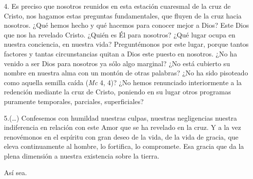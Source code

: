 \begin{body}
4. Es preciso que nosotros reunidos en esta estación cuaresmal de la cruz de Cristo, nos hagamos estas preguntas fundamentales, que fluyen de la cruz hacia nosotros. ¿Qué hemos hecho y qué hacemos para conocer mejor a Dios? Este Dios que nos ha revelado Cristo. ¿Quién es Él para nosotros? ¿Qué lugar ocupa en nuestra conciencia, en nuestra vida? Preguntémonos por este lugar, porque tantos factores y tantas circunstancias quitan a Dios este puesto en nosotros. ¿No ha venido a ser Dios para nosotros ya sólo algo marginal? ¿No está cubierto su nombre en nuestra alma con un montón de otras palabras? ¿No ha sido pisoteado como aquella semilla caída  (\textit{Mc} 4, 4)? ¿No hemos renunciado interiormente a la redención mediante la cruz de Cristo, poniendo en su lugar otros programas puramente temporales, parciales, superficiales?

5.(\ldots) Confesemos con humildad nuestras culpas, nuestras negligencias nuestra indiferencia en relación con este Amor que se ha revelado en la cruz. Y a la vez renovémonos en el espíritu con gran deseo de la vida, de la vida de gracia, que eleva continuamente al hombre, lo fortifica, lo compromete. Esa gracia que da la plena dimensión a nuestra existencia sobre la tierra.

Así sea.
\end{body}

\label{b2-03-04-1979H}

